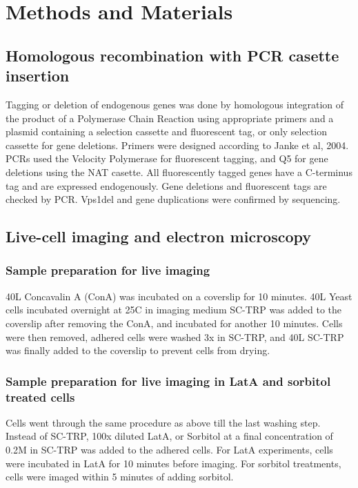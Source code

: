 \documentclass[9pt,lineno]{elife}
\begin{document}
\section{Methods and Materials}

\subsection{Homologous recombination with PCR casette insertion}
Tagging or deletion of endogenous genes was done by homologous integration of the product of a Polymerase Chain Reaction using appropriate primers and a plasmid containing a selection cassette and fluorescent tag, or only selection cassette for gene deletions. Primers were designed according to Janke et al, 2004. PCRs used the Velocity Polymerase for fluorescent tagging, and Q5 for gene deletions using the NAT casette. All fluorescently tagged genes have a C-terminus tag and are expressed endogenously. Gene deletions and fluorescent tags are checked by PCR. Vps1del and gene duplications were confirmed by sequencing.


\subsection{Live-cell imaging and electron microscopy}
\subsubsection{Sample preparation for live imaging}
40{\textmu}L Concavalin A (ConA) was incubated on a coverslip for 10 minutes. 40{\textmu}L Yeast cells incubated overnight at 25C in imaging medium SC-TRP was added to the coverslip after removing the ConA, and incubated for another 10 minutes. Cells were then removed, adhered cells were washed 3x in SC-TRP, and 40{\textmu}L SC-TRP was finally added to the coverslip to prevent cells from drying.

\subsubsection{Sample preparation for live imaging in LatA and sorbitol treated cells}
Cells went through the same procedure as above till the last washing step. Instead of SC-TRP, 100x diluted LatA, or Sorbitol at a final concentration of 0.2M in SC-TRP was added to the adhered cells. For LatA experiments, cells were incubated in LatA for 10 minutes before imaging. For sorbitol treatments, cells were imaged within 5 minutes of adding sorbitol.
\end{document}
